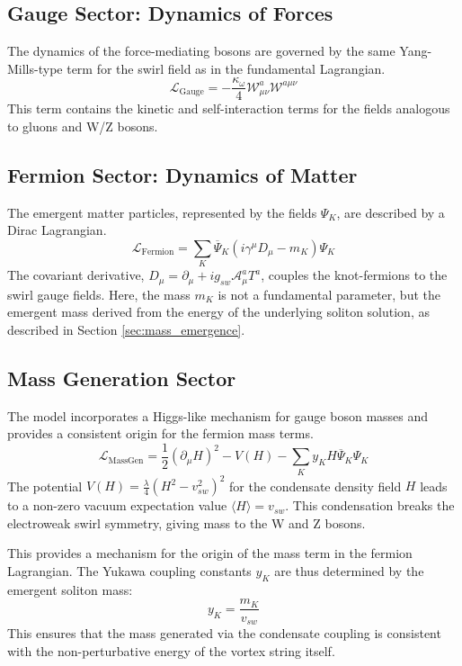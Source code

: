 \documentclass[a4paper,12pt]{article}
\begin{document}
    \subsection{Gauge Sector: Dynamics of Forces}
    The dynamics of the force-mediating bosons are governed by the same Yang-Mills-type term for the swirl field as in the fundamental Lagrangian.
    \begin{equation}
        \mathcal{L}_{\text{Gauge}} = -\frac{\kappa_\omega}{4} \mathcal{W}_{\mu\nu}^a \mathcal{W}^{a \mu\nu}
    \end{equation}
    This term contains the kinetic and self-interaction terms for the fields analogous to gluons and W/Z bosons.

    \subsection{Fermion Sector: Dynamics of Matter}
    The emergent matter particles, represented by the fields $\Psi_K$, are described by a Dirac Lagrangian.
    \begin{equation}
        \mathcal{L}_{\text{Fermion}} = \sum_K \overline{\Psi}_K (i \gamma^\mu D_\mu - m_K) \Psi_K
    \end{equation}
    The covariant derivative, $D_\mu = \partial_\mu + i g_{sw} \mathcal{A}_\mu^a T^a$, couples the knot-fermions to the swirl gauge fields. Here, the mass $m_K$ is not a fundamental parameter, but the emergent mass derived from the energy of the underlying soliton solution, as described in Section \ref{sec:mass_emergence}.

    \subsection{Mass Generation Sector}
    The model incorporates a Higgs-like mechanism for gauge boson masses and provides a consistent origin for the fermion mass terms.
    \begin{equation}
        \mathcal{L}_{\text{MassGen}} = \frac{1}{2}(\partial_\mu H)^2 - V(H) - \sum_K y_K H \overline{\Psi}_K \Psi_K
    \end{equation}
    The potential $V(H) = \frac{\lambda}{4}(H^2 - v_{sw}^2)^2$ for the condensate density field $H$ leads to a non-zero vacuum expectation value $\langle H \rangle = v_{sw}$. This condensation breaks the electroweak swirl symmetry, giving mass to the W and Z bosons.

    This provides a mechanism for the origin of the mass term in the fermion Lagrangian. The Yukawa coupling constants $y_K$ are thus determined by the emergent soliton mass:
    \begin{equation}
        y_K = \frac{m_K}{v_{sw}}
    \end{equation}
    This ensures that the mass generated via the condensate coupling is consistent with the non-perturbative energy of the vortex string itself.
\end{document}
